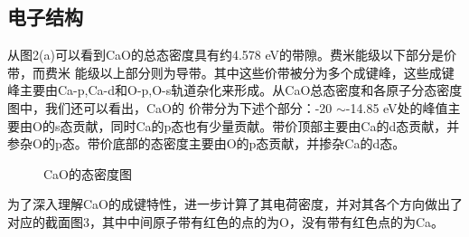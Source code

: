 \documentclass[12pt,a4paper]{article}%
\begin{document}
	\subsection{电子结构}
	从图2(a)可以看到CaO的总态密度具有约4.578 eV的带隙。费米能级以下部分是价带，而费米
	能级以上部分则为导带。其中这些价带被分为多个成键峰，这些成键峰主要由Ca-p,Ca-d和O-p,O-s轨道杂化来形成。从CaO总态密度和各原子分态密度图中，我们还可以看出，CaO的
	价带分为下述个部分：-20 $\sim$-14.85 eV处的峰值主要由O的s态贡献，同时Ca的p态也有少量贡献。带价顶部主要由Ca的d态贡献，并参杂O的p态。带价底部的态密度主要由O的p态贡献，并掺杂Ca的d态。
	\begin{figure}[H]
		\centering    
		\caption{CaO的态密度图} %
	\end{figure}
	为了深入理解CaO的成键特性，进一步计算了其电荷密度，并对其各个方向做出了对应的截面图3，其中中间原子带有红色的点的为O，没有带有红色点的为Ca。
\end{document}
